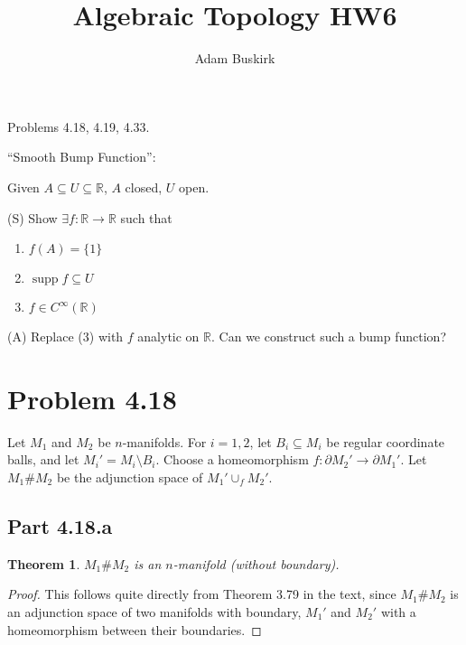 \documentclass{article}
\title{Algebraic Topology HW6}
\author{Adam Buskirk}
\newtheorem{theorem}[subsection]{Theorem}
\theoremstyle{definition}
\newcommand{\R}{\mathbb{R}}
\begin{document}
\maketitle

Problems 4.18, 4.19, 4.33.

``Smooth Bump Function'':

Given $A \subseteq U \subseteq \R$, $A$ closed, $U$ open.

(S) Show $\exists f : \R \to \R$ such that 
\begin{enumerate}
\item $f(A)=\{1\}$
\item $\operatorname{supp} f \subseteq U$
\item $f \in C^\infty (\R)$
\end{enumerate}

(A) Replace (3) with $f$ analytic on $\R$. Can we construct 
such a bump function?

\section{Problem 4.18}
Let $M_1$ and $M_2$ be $n$-manifolds. For $i=1,2$, let 
$B_i \subseteq M_i$ be regular coordinate balls, and let
$M_i' = M_i \setminus B_i$. Choose a homeomorphism 
$f : \partial M_2' \to \partial M_1'$. Let 
$M_1 \# M_2$ be the adjunction space of $M_1' \cup_f M_2'$.
\subsection{Part 4.18.a}
\begin{theorem}
$M_1 \# M_2$ is an $n$-manifold (without boundary).
\end{theorem}
\begin{proof}
This follows quite directly from Theorem 3.79 in the text, since $M_1 \# M_2$ is an
adjunction space of two manifolds with boundary, $M_1'$ and $M_2'$ with
a homeomorphism between their boundaries.
\end{proof}
\end{document}
